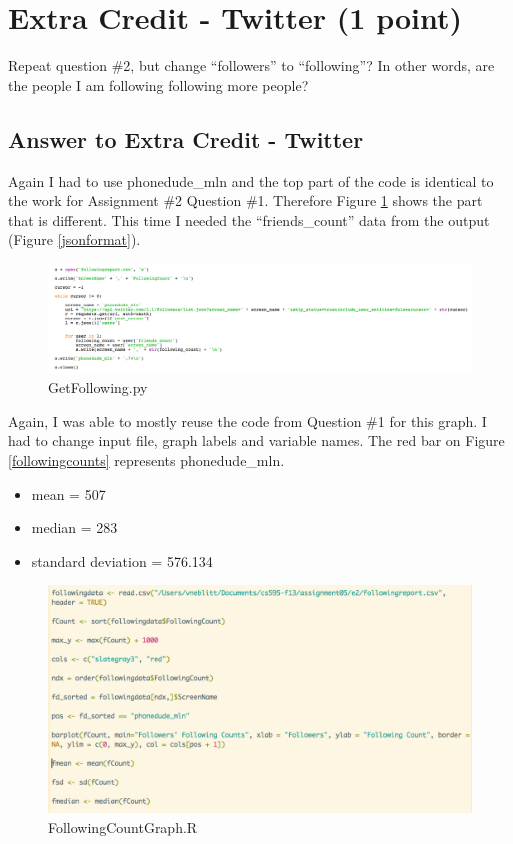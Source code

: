 \documentclass{article}
\begin{document}
\clearpage

\section*{Extra Credit - Twitter (1 point)}

Repeat question \#2, but change ``followers'' to ``following''? In other words, are the people I am following following more people?

\subsection*{Answer to Extra Credit - Twitter}

Again I had to use phonedude\_mln and the top part of the code is identical to the work for Assignment \#2 Question \#1. Therefore Figure \ref{GetFollowingCode} shows the part that is different. This time I needed the ``friends\_count'' data from the output (Figure \ref{jsonformat}).

\begin{figure}[H]
\centering
\includegraphics[scale=0.25]{e2/GetFollowingCode}
\caption{GetFollowing.py}
\label{GetFollowingCode}
\end{figure}

Again, I was able to mostly reuse the code from Question \#1 for this graph. I had to change input file, graph labels and variable names. The red bar on Figure \ref{followingcounts} represents phonedude\_mln.

\begin{itemize}
\item mean = 507
\item median = 283
\item standard deviation = 576.134
\end{itemize}

\begin{figure}[H]
\centering
\includegraphics[scale=0.40]{e2/rscriptTfollowing}
\caption{FollowingCountGraph.R}
\label{followingcountgraph}
\end{figure}
\end{document}
